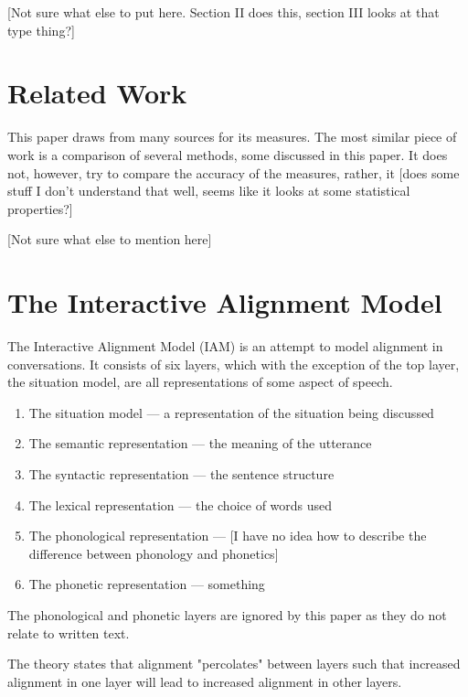 \documentclass[conference]{IEEEtran}
\begin{document}
[Not sure what else to put here. Section II does this, section III looks at that type thing?]


\section{Related Work}
This paper draws from many sources for its measures. The most similar piece of work is a comparison
of several methods\cite{xu2015evaluation}, some discussed in this paper. It does not, however, try
to compare the accuracy of the measures, rather, it [does some stuff I don't understand that well,
seems like it looks at some statistical properties?]

[Not sure what else to mention here]


\section{The Interactive Alignment Model}
The Interactive Alignment Model (IAM)\cite{pickering2004toward} is an attempt to model alignment in
conversations. It consists of six layers, which with the exception of the top layer, the situation
model, are all representations of some aspect of speech.

\begin{enumerate}
	\item The situation model --- a representation of the situation being discussed
	\item The semantic representation --- the meaning of the utterance
	\item The syntactic representation --- the sentence structure
	\item The lexical representation --- the choice of words used
	\item The phonological representation --- [I have no idea how to describe the difference between
		phonology and phonetics]
	\item The phonetic representation --- something
\end{enumerate}

The phonological and phonetic layers are ignored by this paper as they do not relate to written text.

The theory states that alignment "percolates" between layers such that increased alignment in one layer
will lead to increased alignment in other layers.
\end{document}
